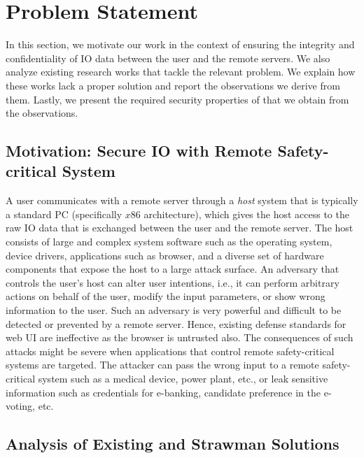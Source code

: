 \section{Problem Statement}
\label{sec:problemStatement}

In this section, we motivate our work in the context of ensuring the integrity and confidentiality of IO data between the user and the remote servers. We also analyze existing research works that tackle the relevant problem. We explain how these works lack a proper solution and report the observations we derive from them. Lastly, we present the required security properties of \name that we obtain from the observations.

\subsection{Motivation: Secure IO with Remote Safety-critical System}

A user communicates with a remote server through a \emph{host} system that is typically a standard PC (specifically $x86$ architecture), which gives the host access to the raw IO data that is exchanged between the user and the remote server. The host consists of large and complex system software such as the operating system, device drivers, applications such as browser, and a diverse set of hardware components that expose the host to a large attack surface. An adversary that controls the user's host can alter user intentions, i.e., it can perform arbitrary actions on behalf of the user, modify the input parameters, or show wrong information to the user. Such an adversary is very powerful and difficult to be detected or prevented by a remote server. Hence, existing defense standards for web UI are ineffective as the browser is untrusted also. The consequences of such attacks might be severe when applications that control remote safety-critical systems are targeted. The attacker can pass the wrong input to a remote safety-critical system such as a medical device, power plant, etc., or leak sensitive information such as credentials for e-banking, candidate preference in the e-voting, etc.





\subsection{Analysis of Existing and Strawman Solutions}
\label{sec:problemStatement:existingSolution}


